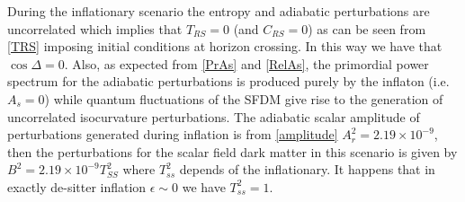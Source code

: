 \documentclass[amssymb,twocolumn,prd,nofootinbib,showpacs]{revtex4-1}
\begin{document}
During the inflationary scenario the entropy and adiabatic perturbations are uncorrelated which 
implies that $T_{RS}=0$ (and $C_{RS}=0$) as can be seen from \eqref{TRS} imposing initial conditions 
at horizon crossing. In this way we have that $\cos\Delta =0$. 
Also, as expected from \eqref{PrAs} and \eqref{RelAs}, the primordial power spectrum for the adiabatic 
perturbations is produced purely by the inflaton (i.e. $A_s=0$) while quantum fluctuations of the SFDM 
give rise to the generation of uncorrelated isocurvature perturbations. 
The adiabatic scalar amplitude of perturbations generated during inflation is from \eqref{amplitude} 
$A_r^2=2.19\times 10^{-9}$, then the perturbations for the scalar field dark matter in this scenario 
is given by $B^2=2.19\times 10^{-9}T_{SS}^2$ where $T_{ss}^2$ depends of the inflationary. 
It happens that in exactly de-sitter inflation $\epsilon\sim 0$ we have $T_{ss}^2=1$. 
\end{document}
